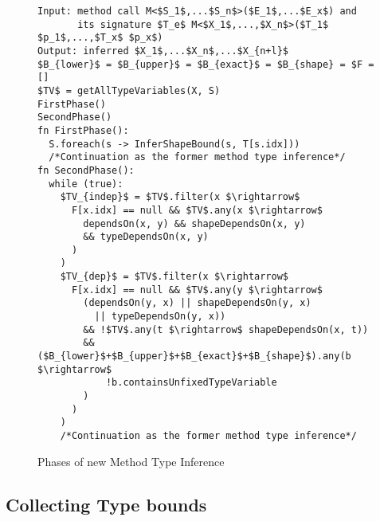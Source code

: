 \begin{figure}[h!]
\begin{lstlisting}[style=myAlgo, mathescape=true]
Input: method call M<$S_1$,...$S_n$>($E_1$,...$E_x$) and 
       its signature $T_e$ M<$X_1$,...,$X_n$>($T_1$ $p_1$,...,$T_x$ $p_x$)
Output: inferred $X_1$,...$X_n$,...$X_{n+l}$
$B_{lower}$ = $B_{upper}$ = $B_{exact}$ = $B_{shape} = $F = []
$TV$ = getAllTypeVariables(X, S)
FirstPhase()
SecondPhase()
fn FirstPhase():
  S.foreach(s -> InferShapeBound(s, T[s.idx]))
  /*Continuation as the former method type inference*/
fn SecondPhase():
  while (true):
    $TV_{indep}$ = $TV$.filter(x $\rightarrow$ 
      F[x.idx] == null && $TV$.any(x $\rightarrow$ 
        dependsOn(x, y) && shapeDependsOn(x, y) 
        && typeDependsOn(x, y)
      )
    )
    $TV_{dep}$ = $TV$.filter(x $\rightarrow$
      F[x.idx] == null && $TV$.any(y $\rightarrow$ 
        (dependsOn(y, x) || shapeDependsOn(y, x) 
          || typeDependsOn(y, x)) 
        && !$TV$.any(t $\rightarrow$ shapeDependsOn(x, t))
        && ($B_{lower}$+$B_{upper}$+$B_{exact}$+$B_{shape}$).any(b $\rightarrow$ 
            !b.containsUnfixedTypeVariable
        )
      )
    )
    /*Continuation as the former method type inference*/
\end{lstlisting}
\caption{Phases of new Method Type Inference}
\label{img54:mainTypeInference1}
\end{figure}

\newpage

\subsection{Collecting Type bounds}


